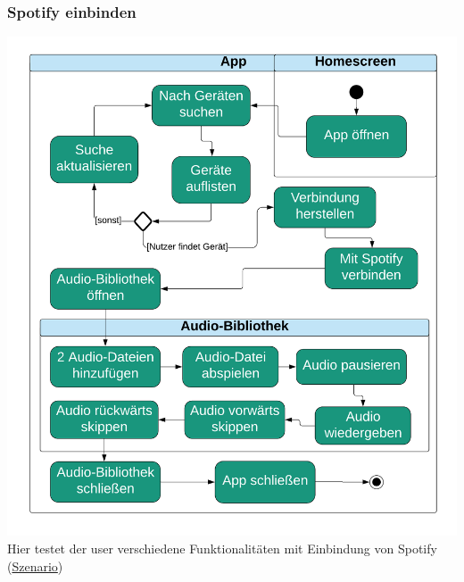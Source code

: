 \documentclass[../pflichtenheft.tex]{subfiles}
\begin{document}
		\subsubsection{Spotify einbinden}
		\label{sec:spotify}
			\includegraphics[page=1,width=400pt,keepaspectratio]{../graphics/UML/Spotify_einbinden.png}
			Hier testet der \Gls{user} verschiedene Funktionalitäten mit Einbindung von Spotify (\hyperref[sec:spotifyS]{Szenario})
\end{document}
